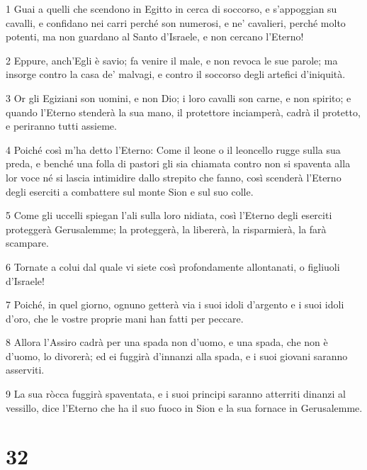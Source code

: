 \par 1 Guai a quelli che scendono in Egitto in cerca di soccorso, e s'appoggian su cavalli, e confidano nei carri perché son numerosi, e ne' cavalieri, perché molto potenti, ma non guardano al Santo d'Israele, e non cercano l'Eterno!
\par 2 Eppure, anch'Egli è savio; fa venire il male, e non revoca le sue parole; ma insorge contro la casa de' malvagi, e contro il soccorso degli artefici d'iniquità.
\par 3 Or gli Egiziani son uomini, e non Dio; i loro cavalli son carne, e non spirito; e quando l'Eterno stenderà la sua mano, il protettore inciamperà, cadrà il protetto, e periranno tutti assieme.
\par 4 Poiché così m'ha detto l'Eterno: Come il leone o il leoncello rugge sulla sua preda, e benché una folla di pastori gli sia chiamata contro non si spaventa alla lor voce né si lascia intimidire dallo strepito che fanno, così scenderà l'Eterno degli eserciti a combattere sul monte Sion e sul suo colle.
\par 5 Come gli uccelli spiegan l'ali sulla loro nidiata, così l'Eterno degli eserciti proteggerà Gerusalemme; la proteggerà, la libererà, la risparmierà, la farà scampare.
\par 6 Tornate a colui dal quale vi siete così profondamente allontanati, o figliuoli d'Israele!
\par 7 Poiché, in quel giorno, ognuno getterà via i suoi idoli d'argento e i suoi idoli d'oro, che le vostre proprie mani han fatti per peccare.
\par 8 Allora l'Assiro cadrà per una spada non d'uomo, e una spada, che non è d'uomo, lo divorerà; ed ei fuggirà d'innanzi alla spada, e i suoi giovani saranno asserviti.
\par 9 La sua ròcca fuggirà spaventata, e i suoi principi saranno atterriti dinanzi al vessillo, dice l'Eterno che ha il suo fuoco in Sion e la sua fornace in Gerusalemme.

\chapter{32}

